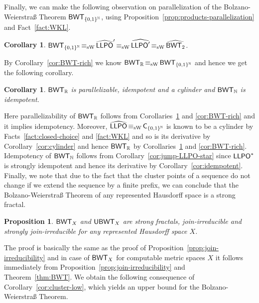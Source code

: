 \documentclass[a4paper]{amsart}
\def\IN{{\mathbb{N}}}
\def\IR{{\mathbb{R}}}
\def\Cantor{{\{0,1\}^\IN}}
\def\LLPO{\text{\rm\sffamily LLPO}}
\def\BWT{\text{\rm\sffamily BWT}}
\def\C{\mbox{\rm\sffamily C}}
\def\LLPO{\mbox{\rm\sffamily LLPO}}
\def\UBWT{\text{\rm\sffamily UBWT}}
\def\equivSW{\mathop{\equiv_{\mathrm{sW}}}}
\newtheorem{proposition}[theorem]{Proposition}
\newtheorem{corollary}[theorem]{Corollary}
\theoremstyle{definition}
\begin{document}
Finally, we can make the following observation on parallelization of the Bolzano-Weierstra\ss{} Theorem $\BWT_\Cantor$,
using Proposition~\ref{prop:products-parallelization} and Fact~\ref{fact:WKL}.

\begin{corollary}
\label{cor:BWT-parallelization}
$\BWT_\Cantor\equivSW\widehat{\LLPO}'\equivSW\widehat{\LLPO'}\equivSW\widehat{\BWT_2}$.
\end{corollary}

By Corollary~\ref{cor:BWT-rich} we know $\BWT_\IR\equivSW\BWT_{\{0,1\}^\IN}$ and hence we get
the following corollary.

\begin{corollary}
\label{cor:BWT-parallelizable-idempotent-cylinder}
$\BWT_\IR$ is parallelizable, idempotent and a cylinder and $\BWT_\IN$ is idempotent.
\end{corollary}

Here parallelizability of $\BWT_\IR$ follows from Corollaries~\ref{cor:BWT-parallelization} and \ref{cor:BWT-rich}
and it implies idempotency.
Moreover, $\widehat{\LLPO}\equivSW\C_{\{0,1\}^\IN}$ is known to be a cylinder by Facts~\ref{fact:closed-choice} and \ref{fact:WKL}
and so is its derivative by Corollary~\ref{cor:cylinder} and hence $\BWT_\IR$ by Corollaries~\ref{cor:BWT-parallelization}
and \ref{cor:BWT-rich}.
Idempotency of $\BWT_\IN$ follows from Corollary~\ref{cor:jump-LLPO-star} since $\LLPO^*$ is strongly idempotent and
hence its derivative by Corollary~\ref{cor:idempotent}. 
Finally, we note that due to the fact that the cluster points of a sequence do not change
if we extend the sequence by a finite prefix, we can conclude that the Bolzano-Weierstra\ss{}
Theorem of any represented Hausdorff space is a strong fractal. 

\begin{proposition}
\label{prop:join-irreducible-BWT}
$\BWT_X$ and $\UBWT_X$ are strong fractals, join-irreducible and strongly join-irreducible for any represented Hausdorff space $X$.
\end{proposition}

The proof is basically the same as the proof of Proposition~\ref{prop:join-irreducibility}
and in case of $\BWT_X$ for computable metric spaces $X$ it follows immediately from 
Proposition~\ref{prop:join-irreducibility} and Theorem~\ref{thm:BWT}.
We obtain the following consequence of Corollary~\ref{cor:cluster-low}, which yields
an upper bound for the Bolzano-Weierstra\ss{} Theorem.
\end{document}
